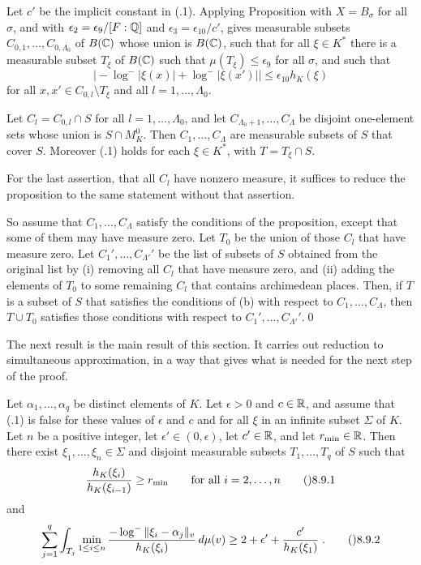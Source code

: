 Let $c'$ be the implicit constant in (.1).
Applying Proposition  with $X=B_\sigma$ for all $\sigma$, and
with $\epsilon_2=\epsilon_9/[F:\Bbb Q]$ and $\epsilon_3=\epsilon_{10}/c'$, gives
measurable subsets $C_{0,1},\dots,C_{0,\Lambda_0}$ of $B(\Bbb C)$
whose union is $B(\Bbb C)$, such that for all $\xi\in K^{*}$
there is a measurable subset $T_\xi$ of $B(\Bbb C)$ such that
$\mu(T_\xi)\le \epsilon_9$ for all $\sigma$, and such that
$$\bigl|-\log^{-}|\xi(x)|+\log^{-}|\xi(x')|\bigr| \le \epsilon_{10} h_K(\xi)$$
for all $x,x'\in C_{0,l}\setminus T_\xi$ and all $l=1,\dots,\Lambda_0$.

Let $C_l=C_{0,l}\cap S$ for all $l=1,\dots,\Lambda_0$, and let
$C_{\Lambda_0+1},\dots,C_\Lambda$ be disjoint one-element sets
whose union is $S\cap M_K^0$.
Then $C_1,\dots,C_\Lambda$ are measurable subsets of $S$ that cover $S$.
Moreover (.1) holds for each $\xi\in K^{*}$, with $T=T_\xi\cap S$.

For the last assertion, that all $C_l$ have nonzero measure, it suffices
to reduce the proposition to the same statement without that assertion.

So assume that $C_1,\dots,C_\Lambda$ satisfy the conditions of the
proposition, except that some of them may have measure zero.
Let $T_0$ be the union of those $C_l$ that have measure zero.
Let $C_1',\dots,C_{\Lambda'}'$ be the list of subsets of $S$ obtained
from the original list by
(i) removing all $C_l$ that have measure zero, and (ii) adding the elements
of $T_0$ to some remaining $C_l$ that contains archimedean places.
Then, if $T$ is a subset of $S$ that satisfies the conditions of (b)
with respect to $C_1,\dots,C_\Lambda$, then $T\cup T_0$ satisfies
those conditions with respect to $C_1',\dots,C_{\Lambda'}'$.\qed
\enddemo

The next result is the main result of this section.  It carries out
reduction to simultaneous approximation, in a way that gives what is needed
for the next step of the proof.

  Let $\alpha_1,\dots,\alpha_q$ be distinct elements of $K$.
Let $\epsilon>0$ and $c\in\Bbb R$, and assume that (.1)
is false for these values of $\epsilon$ and $c$ and for all $\xi$ in
an infinite subset $\Sigma$ of $K$.  Let $n$ be a positive integer,
let $\epsilon'\in(0,\epsilon)$, let $c'\in\Bbb R$, and let $r_{\min}\in\Bbb R$.
Then there exist $\xi_1,\dots,\xi_n\in\Sigma$ and
disjoint measurable subsets $T_1,\dots,T_q$ of $S$ such that
$$\frac{h_K(\xi_i)}{h_K(\xi_{i-1})} \ge r_{\min}
  \qquad\text{for all $i=2,\dots,n$}\tag\08.9.1$$
and
$$\sum_{j=1}^q \int_{T_j} \min_{1\le i\le n}
      \frac{-\log^{-}\|\xi_i-\alpha_j\|_v}{h_K(\xi_i)} \,d\mu(v)
  \ge 2+\epsilon' + \frac{c'}{h_K(\xi_1)}\;.\tag\08.9.2$$
\endit

